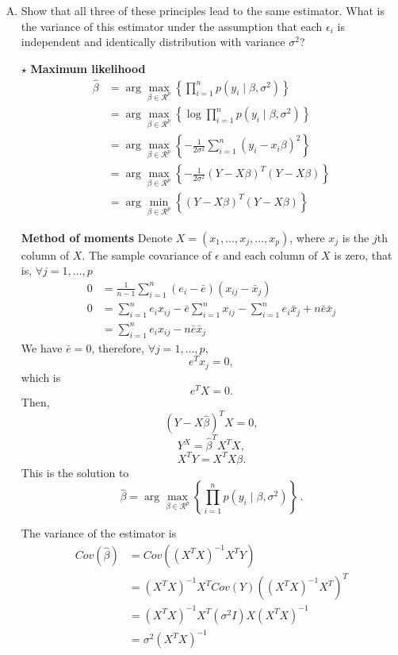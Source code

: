 \documentclass[11pt]{article}
\newcommand{\jie}{$\star$ }
\begin{document}
\begin{enumerate}[(A)]

\item Show that all three of these principles lead to the same estimator.  What is the variance of this estimator under the assumption that each $\epsilon_i$ is independent and identically distribution with variance $\sigma^2$?  

\bigskip

\jie
\textbf{Maximum likelihood}
\begin{align*}
    \hat{\beta} &= \arg \max_{\beta \in \mathcal{R}^p} \left\{ \prod_{i=1}^n p(y_i \mid \beta, \sigma^2) \right\} \\
    &= \arg \max_{\beta \in \mathcal{R}^p} \left\{ \log \prod_{i=1}^n p(y_i \mid \beta, \sigma^2) \right\} \\
    &= \arg \max_{\beta \in \mathcal{R}^p} \left\{ -\frac{1}{2\sigma^2} \sum_{i=1}^n (y_i-x_i \beta)^2 \right\} \\
    &= \arg \max_{\beta \in \mathcal{R}^p} \left\{ -\frac{1}{2\sigma^2} (Y-X\beta)^T(Y-X\beta) \right\} \\
    &= \arg \min_{\beta \in \mathcal{R}^p} \left\{ (Y-X\beta)^T(Y-X\beta) \right\} 
\end{align*}

\textbf{Method of moments}
Denote $X= (x_1,\dots,x_j,\dots,x_p)$, where $x_j$ is the $j$th column of $X$. The sample covariance of $\epsilon$ and each column of $X$ is zero, that is, $\forall j=1,\dots,p$
\begin{align*}
    0 &= \frac{1}{n-1} \sum_{i=1}^n (e_i - \bar{e})(x_{ij}-\bar{x}_j) \\
    0 &= \sum_{i=1}^n e_i x_{ij} - \bar{e}\sum_{i=1}^n x_{ij} - \sum_{i=1}^n e_i \bar{x}_j + n \bar{e}\bar{x}_j \\
    &= \sum_{i=1}^n e_i x_{ij} - n\bar{e}\bar{x}_j
\end{align*}
We have $\bar{e} = 0$, therefore, $\forall j=1,\dots,p$,
$$e^T x_j = 0,$$
which is 
$$e^T X = 0.$$
Then,
$$(Y-X\hat{\beta})^TX=0,$$
$$Y^X = \hat{\beta}^TX^TX,$$
$$X^TY = X^TX\beta.$$
This is the solution to 
$$
\hat{\beta} = \arg \max_{\beta \in \mathcal{R}^p} \left\{ \prod_{i=1}^n p(y_i \mid \beta, \sigma^2) \right\} \, .
$$

The variance of the estimator is
\begin{align*}
    Cov(\hat{\beta}) &= Cov((X^TX)^{-1}X^TY) \\
    &= (X^TX)^{-1}X^T Cov(Y) ((X^TX)^{-1}X^T)^T \\
    &= (X^TX)^{-1}X^T (\sigma^2 I) X (X^TX)^{-1} \\
     &= \sigma^2 (X^TX)^{-1}
\end{align*}


\end{enumerate}
\end{document}
